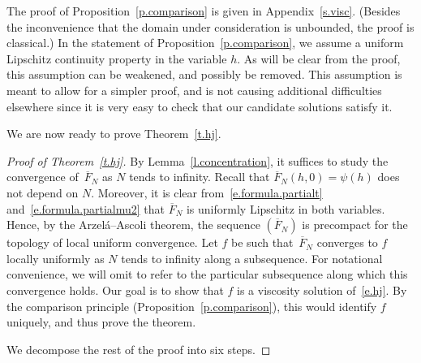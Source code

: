 \documentclass[10pt]{amsart}
\theoremstyle{definition}\newtheorem{defi}[theo]{Definition}\newtheorem{rema}[theo]{Remark}\newtheorem{exam}[theo]{Example}\newtheorem{exem}[theo]{Example}\newtheorem{nota}[theo]{Notation}
\newcommand{\1}{\mathds{1}}
\renewcommand{\bar}{\overline}
\begin{document}
The proof of Proposition~\ref{p.comparison} is given in Appendix~\ref{s.visc}. (Besides the inconvenience that the domain under consideration is unbounded, the proof is classical.) In the statement of Proposition~\ref{p.comparison}, we assume a uniform Lipschitz continuity property in the variable $h$. As will be clear from the proof, this assumption can be weakened, and possibly be removed. This assumption is meant to allow for a simpler proof, and is not causing additional difficulties elsewhere since it is very easy to check that our candidate solutions satisfy it.


We are now ready to prove Theorem~\ref{t.hj}.


\begin{proof}[Proof of Theorem~\ref{t.hj}]
By Lemma~\ref{l.concentration}, it suffices to study the convergence of~$\bar F_N$ as $N$ tends to infinity. Recall that $\bar F_N(h,0) = \psi(h)$ does not depend on $N$. Moreover, it is clear from~\eqref{e.formula.partialt} and~\eqref{e.formula.partialmu2} that $\bar F_N$ is uniformly Lipschitz in both variables. Hence, by the Arzelá--Ascoli theorem, the sequence $(\bar F_N)$ is precompact for the topology of local uniform convergence. Let $f$ be such that~$\bar F_N$ converges to $f$ locally uniformly as $N$ tends to infinity along a subsequence. For notational convenience, we will omit to refer to the particular subsequence along which this convergence holds. Our goal is to show that $f$ is a viscosity solution of~\eqref{e.hj}. By the comparison principle (Proposition~\ref{p.comparison}), this would identify $f$ uniquely, and thus prove the theorem.


We decompose the rest of the proof into six steps.



\end{proof}
\end{document}
